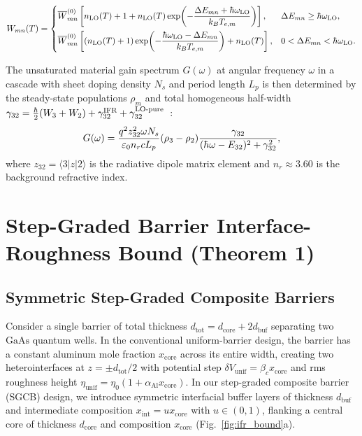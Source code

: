 \documentclass[11pt,letterpaper]{article}
\renewcommand{\hbar}{\mathchar'26\mkern-9mu h}
\begin{document}
\begin{enumerate}
\begin{equation}
    W_{mn}(T) = \begin{cases}
    \overline{W}_{mn}^{(0)}\left[ n_{\mathrm{LO}}(T) + 1 + n_{\mathrm{LO}}(T)\exp\!\left(-\dfrac{\Delta E_{mn} + \hbar\omega_{\mathrm{LO}}}{k_B T_{e,m}}\right) \right], & \Delta E_{mn} \ge \hbar\omega_{\mathrm{LO}}, \\[10pt]
    \overline{W}_{mn}^{(0)}\left[ \left(n_{\mathrm{LO}}(T) + 1\right)\exp\!\left(-\dfrac{\hbar\omega_{\mathrm{LO}} - \Delta E_{mn}}{k_B T_{e,m}}\right) + n_{\mathrm{LO}}(T) \right], & 0 < \Delta E_{mn} < \hbar\omega_{\mathrm{LO}}.
    \end{cases}
    \label{eq:thermal_avg_branches}
    \end{equation}
\end{enumerate}

The unsaturated material gain spectrum $G(\omega)$ at angular frequency $\omega$ in a cascade with sheet doping density $N_s$ and period length $L_p$ is then determined by the steady-state populations $\rho_m$ and total homogeneous half-width $\gamma_{32} = \frac{\hbar}{2}(W_3 + W_2) + \gamma_{32}^{\mathrm{IFR}} + \gamma_{32}^{\mathrm{LO\text{-}pure}}$~\cite{Vurgaftman2021}:
\begin{equation}
G(\omega) = \frac{q^2 z_{32}^2 \omega N_s}{\varepsilon_0 n_r c L_p} (\rho_3 - \rho_2) \frac{\gamma_{32}}{(\hbar\omega - E_{32})^2 + \gamma_{32}^2},
\label{eq:gain_general}
\end{equation}
where $z_{32} = \langle 3|z|2\rangle$ is the radiative dipole matrix element and $n_r \approx 3.60$ is the background refractive index.

\section{Step-Graded Barrier Interface-Roughness Bound (Theorem 1)}
\label{sec:theorem1}

\subsection{Symmetric Step-Graded Composite Barriers}
\label{subsec:symmetric_sgcb}

Consider a single barrier of total thickness $d_{\mathrm{tot}} = d_{\mathrm{core}} + 2 d_{\mathrm{buf}}$ separating two $\mathrm{GaAs}$ quantum wells. In the conventional uniform-barrier design, the barrier has a constant aluminum mole fraction $x_{\mathrm{core}}$ across its entire width, creating two heterointerfaces at $z = \pm d_{\mathrm{tot}}/2$ with potential step $\delta V_{\mathrm{unif}} = \beta_c x_{\mathrm{core}}$ and rms roughness height $\eta_{\mathrm{unif}} = \eta_0(1 + \alpha_{\mathrm{Al}} x_{\mathrm{core}})$. In our step-graded composite barrier (SGCB) design, we introduce symmetric interfacial buffer layers of thickness $d_{\mathrm{buf}}$ and intermediate composition $x_{\mathrm{int}} = u x_{\mathrm{core}}$ with $u \in (0,1)$, flanking a central core of thickness $d_{\mathrm{core}}$ and composition $x_{\mathrm{core}}$ (Fig.~\ref{fig:ifr_bound}a).
\end{document}
